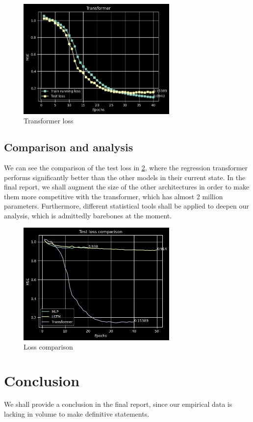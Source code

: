 \documentclass{article}
\begin{document}
\begin{figure} \label{fig:transformer_accuracy}
    \caption{Transformer loss} \center
    \includegraphics[width=0.7\textwidth]{images/2023-04-02-13-48-49.png}
\end{figure}



\subsection{Comparison and analysis}
We can see the comparison of the test loss in \ref{fig:comparison}, where
the regression transformer performs significantly better than the other
models in their current state. In the final report, we 
shall augment the size of the other architectures in order to make them more
competitive with the transformer, which has almost 2 million parameters. 
Furthermore, different statistical tools shall be applied to deepen 
our analysis, which is admittedly barebones at the moment. 

\begin{figure} \label{fig:comparison}
    \caption{Loss comparison} \center
    \includegraphics[width=0.7\textwidth]{images/2023-04-02-18-40-10.png}
\end{figure}
\section{Conclusion}
We shall provide a conclusion in the final report, since our empirical 
data is lacking in volume to make definitive statements. 



\end{document}
